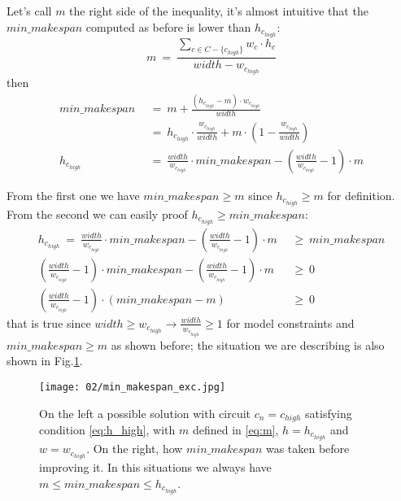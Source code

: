         Let's call $m$ the right side of the inequality, it's almost intuitive that the $min\_makespan$ computed
        as before is lower than $h_{c_{high}}$:
        \begin{equation}
            m\ =\ \frac{\sum_{c \in C - \{c_{high}\}} w_c \cdot h_c}{width - w_{c_{high}}}
            \label{eq:m}
        \end{equation}
        then
        \begin{align*}
            min\_makespan\  &\ =\ m + \frac{(h_{c_{high}} - m) \cdot w_{c_{high}}}{width}                                               \\
                            &\ =\ h_{c_{high}} \cdot \frac{w_{c_{high}}}{width} + m \cdot \left(1 - \frac{w_{c_{high}}}{width}\right)   \\
            h_{c_{high}}\   &\ =\ \frac{width}{w_{c_{high}}} \cdot min\_makespan - \left( \frac{width}{w_{c_{high}}} - 1\right) \cdot m
        \end{align*}

        From the first one we have $min\_makespan \geq m$ since $h_{c_{high}} \geq m$ for definition.
        From the second we can easily proof $h_{c_{high}} \geq min\_makespan$:
        \begin{align*}
            h_{c_{high}}\ =\ \frac{width}{w_{c_{high}}} \cdot min\_makespan - \left( \frac{width}{w_{c_{high}}} - 1\right) \cdot m\ &\ \geq\ min\_makespan       \\
            \left( \frac{width}{w_{c_{high}}} - 1\right) \cdot min\_makespan - \left( \frac{width}{w_{c_{high}}} - 1\right) \cdot m\ &\ \geq\ 0 \\
            \left( \frac{width}{w_{c_{high}}} - 1\right) \cdot \left(min\_makespan - m\right) \ &\ \geq\ 0
        \end{align*}
        that is true since $width \geq w_{c_{high}} \rightarrow \frac{width}{w_{c_{high}}} \geq 1$ for model constraints and $min\_makespan \geq m$ as shown before;
        the situation we are describing is also shown in Fig.\ref{fig:min_makespan}. 

        \begin{figure}[H]
            \centering
            \texttt{[image: 02/min\_makespan\_exc.jpg]}
            \caption{
                On the left a possible solution with circuit $c_n=c_{high}$ satisfying condition \ref{eq:h_high}, 
                with $m$ defined in \ref{eq:m}, $h = h_{c_{high}}$ and $w = w_{c_{high}}$. On the right, how $min\_makespan$ was taken before
                improving it. In this situations we always have $m \leq min\_makespan \leq h_{c_{high}}$.
            }
            \label{fig:min_makespan}
        \end{figure}
        
